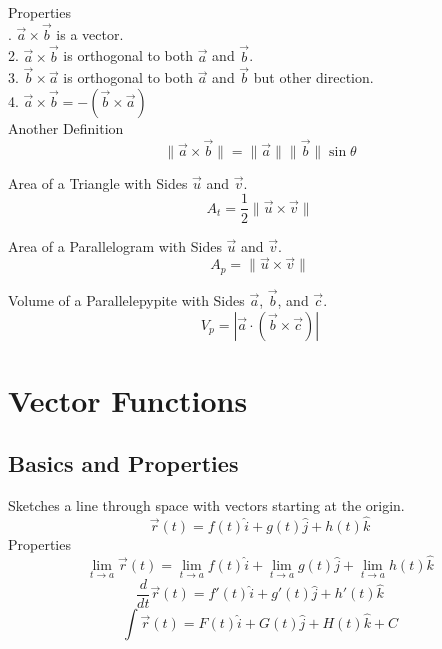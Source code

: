 \documentclass[12pt]{article}
\numberwithin{equation}{subsection}
\newcommand{\magp}[1]{\| #1 \|}
\newcommand{\absp}[1]{\left\vert #1 \right\vert}
\begin{document}
\begin{flushleft}
Properties\\
. $\vec{a} \times \vec{b}$ is a vector.\\
2. $\vec{a} \times \vec{b}$ is orthogonal to both $\vec{a}$ and $\vec{b}$.\\
3. $\vec{b} \times \vec{a}$ is orthogonal to both $\vec{a}$ and $\vec{b}$ but other direction.\\
4. $\vec{a} \times \vec{b} = -(\vec{b} \times \vec{a})$\\

Another Definition
\begin{equation}
\magp{\vec{a} \times \vec{b}}= \magp{\vec{a}} \magp{\vec{b}} \sin{\theta}
\end{equation}

Area of a Triangle with Sides $\vec{u}$ and $\vec{v}$.
\begin{equation}
A_{t}=\frac{1}{2} \magp{\vec{u} \times \vec{v}}
\end{equation}

Area of a Parallelogram with Sides $\vec{u}$ and $\vec{v}$.
\begin{equation}
A_{p}=\magp{\vec{u} \times \vec{v}}
\end{equation}

Volume of a Parallelepypite with Sides $\vec{a}$, $\vec{b}$, and $\vec{c}$.
\begin{equation}
V_{p}=\absp{\vec{a} \cdot (\vec{b} \times \vec{c})}
\end{equation}
\newpage

\section{Vector Functions}
\subsection{Basics and Properties}
Sketches a line through space with vectors starting at the origin.
\begin{equation}
\vec{r}(t)= f(t)\hat{i}+g(t)\hat{j}+h(t)\hat{k}
\end{equation}
Properties
\begin{equation}
\lim_{t \rightarrow a}\vec{r}(t)= \lim_{t \rightarrow a}f(t)\hat{i}+\lim_{t \rightarrow a}g(t)\hat{j}+\lim_{t \rightarrow a}h(t)\hat{k}
\end{equation}
\begin{equation}
\frac{d}{dt}\vec{r}(t)= f'(t)\hat{i}+g'(t)\hat{j}+h'(t)\hat{k}
\end{equation}
\begin{equation}
\int\vec{r}(t)= F(t)\hat{i}+G(t)\hat{j}+H(t)\hat{k}+C
\end{equation}


\end{flushleft}
\end{document}
